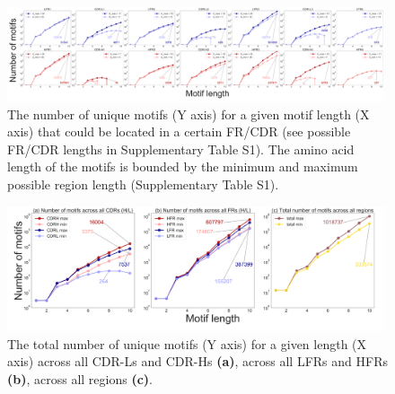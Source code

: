 \documentclass[fleqn, oneside, listof=totoc,%
 bibliography=totoc, paper=A4]{scrartcl}[2007/12/24]
\begin{document}
\begin{figure}[!ht]
\includegraphics[width=0.99\textwidth]{figures/motifs_number_fig.pdf}
\caption[]{The number of unique motifs (Y axis) for a given motif length (X axis) that could be located in a certain FR/CDR (see possible FR/CDR lengths in Supplementary Table S1). The amino acid length of the motifs is bounded by the minimum and maximum possible region length (Supplementary Table S1).}
\label{fig:motifs_count_by_region} 
\end{figure}
\begin{figure}[!ht]
\includegraphics[width=0.99\textwidth]{figures/total_motifs_number_fig.pdf}
\caption[]{The total number of unique motifs (Y axis) for a given length (X axis) across all CDR-Ls and CDR-Hs \textbf{(a)}, across all LFRs and HFRs \textbf{(b)}, across all regions \textbf{(c)}.}
\label{fig:total_motifs_count}
\end{figure}
\end{document}
